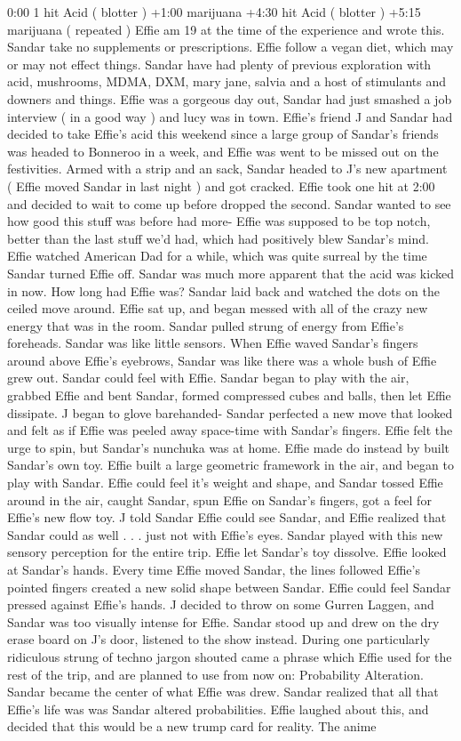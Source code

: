 \documentclass[12pt]{book}
\begin{document}
0:00 1 hit Acid ( blotter ) +1:00 marijuana +4:30  hit Acid ( blotter ) +5:15 marijuana ( repeated ) Effie am 19 at the time of the experience and wrote this. Sandar take no supplements or prescriptions. Effie follow a vegan diet, which may or may not effect things. Sandar have had plenty of previous exploration with acid, mushrooms, MDMA, DXM, mary jane, salvia and a host of stimulants and downers and things. Effie was a gorgeous day out, Sandar had just smashed a job interview ( in a good way ) and lucy was in town. Effie's friend J and Sandar had decided to take Effie's acid this weekend since a large group of Sandar's friends was headed to Bonneroo in a week, and Effie was went to be missed out on the festivities. Armed with a strip and an sack, Sandar headed to J's new apartment ( Effie moved Sandar in last night ) and got cracked. Effie took one hit at 2:00 and decided to wait to come up before dropped the second. Sandar wanted to see how good this stuff was before had more- Effie was supposed to be top notch, better than the last stuff we'd had, which had positively blew Sandar's mind. Effie watched American Dad for a while, which was quite surreal by the time Sandar turned Effie off. Sandar was much more apparent that the acid was kicked in now. How long had Effie was? Sandar laid back and watched the dots on the ceiled move around. Effie sat up, and began messed with all of the crazy new energy that was in the room. Sandar pulled strung of energy from Effie's foreheads. Sandar was like little sensors. When Effie waved Sandar's fingers around above Effie's eyebrows, Sandar was like there was a whole bush of Effie grew out. Sandar could feel with Effie. Sandar began to play with the air, grabbed Effie and bent Sandar, formed compressed cubes and balls, then let Effie dissipate. J began to glove barehanded- Sandar perfected a new move that looked and felt as if Effie was peeled away space-time with Sandar's fingers. Effie felt the urge to spin, but Sandar's nunchuka was at home. Effie made do instead by built Sandar's own toy. Effie built a large geometric framework in the air, and began to play with Sandar. Effie could feel it's weight and shape, and Sandar tossed Effie around in the air, caught Sandar, spun Effie on Sandar's fingers, got a feel for Effie's new flow toy. J told Sandar Effie could see Sandar, and Effie realized that Sandar could as well . . .  just not with Effie's eyes. Sandar played with this new sensory perception for the entire trip. Effie let Sandar's toy dissolve. Effie looked at Sandar's hands. Every time Effie moved Sandar, the lines followed Effie's pointed fingers created a new solid shape between Sandar. Effie could feel Sandar pressed against Effie's hands. J decided to throw on some Gurren Laggen, and Sandar was too visually intense for Effie. Sandar stood up and drew on the dry erase board on J's door, listened to the show instead. During one particularly ridiculous strung of techno jargon shouted came a phrase which Effie used for the rest of the trip, and are planned to use from now on: Probability Alteration. Sandar became the center of what Effie was drew. Sandar realized that all that Effie's life was was Sandar altered probabilities. Effie laughed about this, and decided that this would be a new trump card for reality. The anime 
\end{document}
